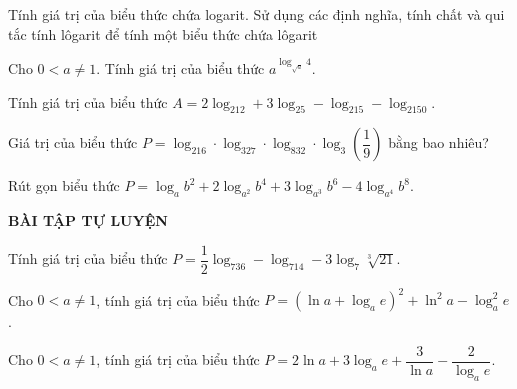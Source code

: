 \begin{dang}{Tính giá trị của biểu thức chứa logarit.}
    Sử dụng các định nghĩa, tính chất và qui tắc tính lôgarit để tính một biểu thức chứa lôgarit
\end{dang}
\begin{vd}%
    Cho $0<a\neq 1$. Tính giá trị của biểu thức $a^{\log_{\sqrt{a}}4}$.
\end{vd}
\begin{vd}%
   Tính giá trị của biểu thức $A=2\log_212+3\log_25-\log_215-\log_2150$.
\end{vd}
\begin{vd}%
    Giá trị của biểu thức $P=\log_216\cdot \log_327\cdot \log_832 \cdot \log_3 \left( \dfrac{1}{9} \right)$ bằng bao nhiêu?
\end{vd}
\begin{vd}%
    Rút gọn biểu thức $P=\log_ab^2+2\log_{a^2}b^4+3\log_{a^3}b^6-4\log_{a^4}b^8$. 
\end{vd}


\begin{center}
    \textbf{BÀI TẬP TỰ LUYỆN}
\end{center}
\begin{bt}%
    Tính giá trị của biểu thức $P=\dfrac{1}{2}\log_736-\log_714-3\log_7\sqrt[3]{21}$.
\end{bt}

\begin{bt} %
    Cho $0<a\neq 1$, tính giá trị của biểu thức $P=(\ln a+\log_ae)^2+\ln^2a-\log_a^2e$.
\end{bt}

\begin{bt}%
    Cho $ 0< a \neq 1 $, tính giá trị của biểu thức $P=2\ln a+3\log_a e+\dfrac{3}{\ln a}-\dfrac{2}{\log_a e} $.
\end{bt}

